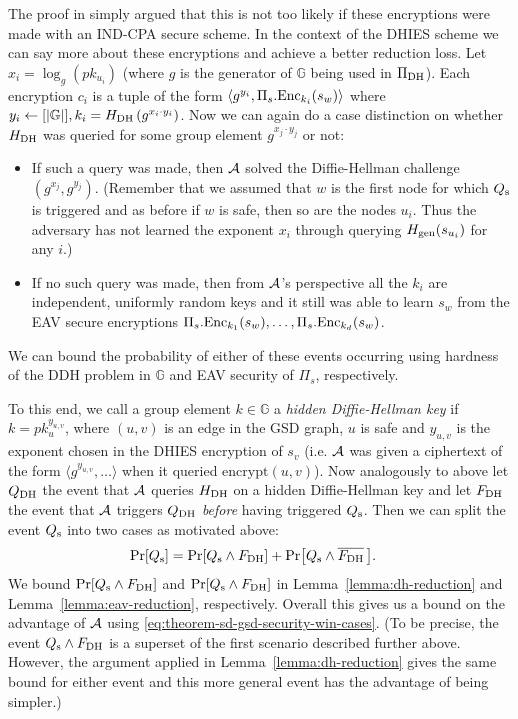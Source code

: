 
The proof in \cite{ttkem} simply argued that this is not too likely if these encryptions were made with an IND-CPA secure scheme. In the context of the DHIES scheme we can say more about these encryptions and achieve a better reduction loss.
Let $x_i = \log_g(pk_{u_i})$ (where $g$ is the generator of $\mathbb{G}$ being used in $\Pi_{\mathrm{DH}}$). Each encryption $c_i$ is a tuple of the form $\langle g^{y_i}, \Pi_s.\mathrm{Enc}_{k_i}(s_w) \rangle$ where $y_i \leftarrow [\lvert\mathbb{G}\rvert], k_i = H_\mathrm{DH}\left(g^{x_i \cdot y_i}\right)$. Now we can again do a case distinction on whether $H_\mathrm{DH}$ was queried for some group element $g^{x_j \cdot y_j}$ or not:
\begin{itemize}
	\item If such a query was made, then $\mathcal{A}$ solved the Diffie-Hellman challenge $(g^{x_j}, g^{y_j})$. (Remember that we assumed that $w$ is the first node for which $Q_\mathrm{s}$ is triggered and as before if $w$ is safe, then so are the nodes $u_i$. Thus the adversary has not learned the exponent $x_i$ through querying $H_\mathrm{gen}(s_{u_i})$ for any $i$.)
	\item If no such query was made, then from $\mathcal{A}$'s perspective all the $k_i$ are independent, uniformly random keys and it still was able to learn $s_w$ from the EAV secure encryptions $\Pi_s.\mathrm{Enc}_{k_1}(s_w), \ldots, \Pi_s.\mathrm{Enc}_{k_d}(s_w)$.
\end{itemize}
We can bound the probability of either of these events occurring using hardness of the DDH problem in $\mathbb{G}$ and EAV security of $\Pi_s$, respectively.

To this end, we call a group element $k \in \mathbb{G}$ a \emph{hidden Diffie-Hellman key} if $k = pk_u^{y_{u, v}}$, where $(u, v)$ is an edge in the GSD graph, $u$ is safe and $y_{u, v}$ is the exponent chosen in the DHIES encryption of $s_v$ (i.e. $\mathcal{A}$ was given a ciphertext of the form $\langle g^{y_{u, v}}, \ldots\rangle$ when it queried $\mathrm{encrypt}(u, v)$). Now analogously to above let $Q_\mathrm{DH}$ the event that $\mathcal{A}$ queries $H_\mathrm{DH}$ on a hidden Diffie-Hellman key and let $F_\mathrm{DH}$ the event that $\mathcal{A}$ triggers $Q_\mathrm{DH}$ \emph{before} having triggered $Q_\mathrm{s}$. Then we can split the event $Q_\mathrm{s}$ into two cases as motivated above:
\begin{align*}
	\pr{\qs} & = \pr{\qs \land \fdh} + \pr{\qs \land \overline{\fdh}\,}.
\end{align*}
We bound $\pr{\qs \land \fdh}$ and $\pr{\qs \land \fdh}$ in Lemma~\ref{lemma:dh-reduction} and Lemma~\ref{lemma:eav-reduction}, respectively. Overall this gives us a bound on the advantage of $\mathcal{A}$ using \eqref{eq:theorem-sd-gsd-security-win-cases}. (To be precise, the event $Q_\mathrm{s} \land F_\mathrm{DH}$ is a superset of the first scenario described further above. However, the argument applied in Lemma~\ref{lemma:dh-reduction} gives the same bound for either event and this more general event has the advantage of being simpler.)

